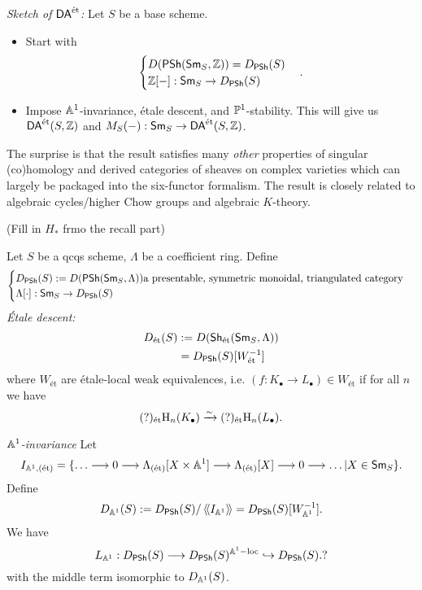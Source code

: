 \emph{Sketch of $\DAet$:} Let $S$ be a base scheme.
\begin{itemize}
	\item Start with
		\[
		\begin{cases}
			D(\PSh(\Sm_S, \Z)) = D_{\PSh}(S) \\
			\Z[-]: \Sm_S \to D_{\PSh}(S)
		\end{cases}
		.\] 
	\item Impose $\Aff^{1}$-invariance, \'etale descent, and $\P^{1}$-stability. This will give us $\DAet(S,\Z)$ and $M_S(-):\Sm_S\to \DAet(S,\Z)$.
\end{itemize}
The surprise is that the result satisfies many \emph{other} properties of singular (co)homology and derived categories of sheaves on complex varieties which can largely be packaged into the six-functor formalism. The result is closely related to algebraic cycles/higher Chow groups and algebraic $K$-theory.

(Fill in $H_*$ frmo the recall part)

Let $S$ be a qcqs scheme, $\Lambda$ be a coefficient ring. Define
\[
	\begin{cases}
		D_{\PSh}(S) \defeq D(\PSh(\Sm_S,\Lambda)) \text{a presentable, symmetric monoidal, triangulated category}\\
		\Lambda[\cdot ]:\Sm_S \to D_{\PSh}(S)
	\end{cases}
\] 
\emph{\'Etale descent:}
\begin{align*}
	D_{\text{\'et}}(S) &\defeq D(\Sh_{\text{\'et}}(\Sm_S,\Lambda)) \\
			   &= D_{\PSh}(S)[W_{\text{\'et}}^{-1}]
\end{align*}
where $W_{\text{\'et}}$ are \'etale-local weak equivalences, i.e. $(f:K_\bullet\to L_\bullet)\in W_{\text{\'et}}$ if for all $n$ we have
\[
	(?)_{\text{\'et}}\CH_n(K_\bullet) \simto (?)_{\text{\'et}}\CH_n(L_\bullet).
\] 

\emph{$\Aff^{1}$-invariance}
Let
\[
	I_{\Aff^{1},(\text{\'et})} = \{\dots\to 0\to \Lambda_{(\text{\'et})}[X\times \Aff^{1}]\to \Lambda_{(\text{\'et})}[X]\to 0\to \dots | X\in \Sm_S\} .
\] 
Define
\[
	D_{\Aff^{1}}(S) \defeq D_{\PSh}(S) / \gen{I_{\Aff^{1}}} = D_{\PSh}(S)[W_{\Aff^{1}}^{-1}].
\] 
We have
\[
L_{\Aff^{1}}: D_{\PSh}(S) \to D_{\PSh}(S)^{\Aff^{1}-\text{loc}} \injto D_{\PSh}(S).?
\] 
with the middle term isomorphic to $D_{\Aff^{1}}(S)$.

